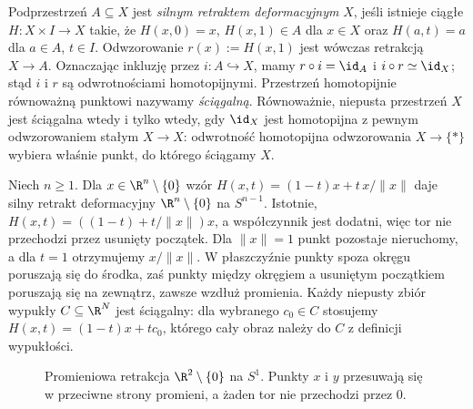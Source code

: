 \begin{definicja}
\label{def:retrakt-deformacyjny}
Podprzestrzeń $A\subseteq X$ jest
\emph{silnym retraktem deformacyjnym} $X$,
jeśli istnieje ciągłe $H:X\times I\to X$ takie, że
 $H(x,0)=x$, $H(x,1)\in A$ dla $x\in X$
 oraz $H(a,t)=a$ dla $a\in A$, $t\in I$.
Odwzorowanie $r(x):=H(x,1)$ jest wówczas
retrakcją $X\to A$. Oznaczając inkluzję przez
$i:A\hookrightarrow X$, mamy $r\circ i=\id_A$ i $i\circ r\simeq\id_X$;
stąd $i$ i $r$ są odwrotnościami homotopijnymi.
Przestrzeń homotopijnie równoważną punktowi
nazywamy \emph{ściągalną}. Równoważnie, niepusta
przestrzeń $X$ jest ściągalna wtedy i tylko wtedy,
gdy $\id_X$ jest homotopijna z pewnym odwzorowaniem
stałym $X\to X$: odwrotność homotopijna odwzorowania
$X\to\{*\}$ wybiera właśnie punkt, do którego
ściągamy $X$.
\end{definicja}

\begin{przyklad}
\label{prz:retrakcja-pierscien}
Niech $n\geq1$. Dla $x\in\R^n\setminus\{0\}$ wzór
$H(x,t)=(1-t)x+t\,x/\|x\|$ daje silny retrakt deformacyjny
$\R^n\setminus\{0\}$ na $S^{n-1}$.
Istotnie, $H(x,t)=((1-t)+t/\|x\|)x$, a współczynnik
jest dodatni, więc tor nie przechodzi przez usunięty
początek. Dla $\|x\|=1$ punkt pozostaje nieruchomy,
a dla $t=1$ otrzymujemy $x/\|x\|$. W płaszczyźnie
punkty spoza okręgu poruszają się do środka, zaś
punkty między okręgiem a usuniętym początkiem
poruszają się na zewnątrz, zawsze wzdłuż promienia.
Każdy niepusty zbiór wypukły $C\subseteq\R^N$ jest ściągalny:
dla wybranego $c_0\in C$ stosujemy
$H(x,t)=(1-t)x+tc_0$, którego cały obraz należy
do $C$ z definicji wypukłości.
\end{przyklad}

\begin{figure}[!htbp]
\centering
{}
\caption{Promieniowa retrakcja $\R^2\setminus\{0\}$ na $S^1$.
Punkty $x$ i $y$ przesuwają się w przeciwne strony
promieni, a żaden tor nie przechodzi przez $0$.}
\label{fig:retrakcja-promieniowa}
\end{figure}

